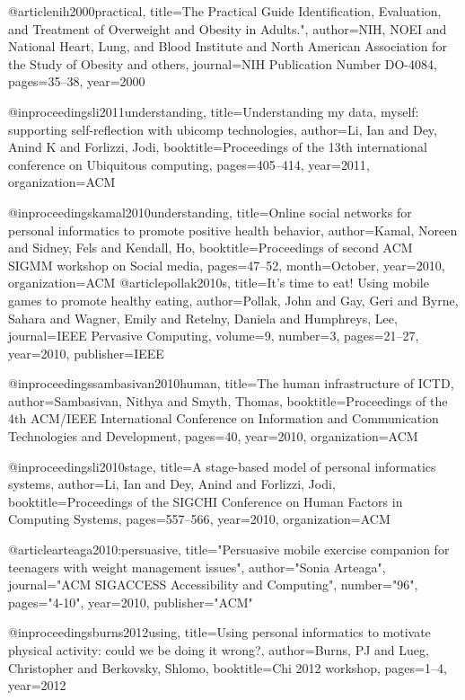 @article{nih2000practical,
  title={The Practical Guide Identification, Evaluation, and Treatment of Overweight and Obesity in Adults."},
  author={NIH, NOEI and National Heart, Lung, and Blood Institute and North American Association for the Study of Obesity and others},
  journal={NIH Publication Number DO-4084},
  pages={35--38},
  year={2000}
}

@inproceedings{li2011understanding,
  title={Understanding my data, myself: supporting self-reflection with ubicomp technologies},
  author={Li, Ian and Dey, Anind K and Forlizzi, Jodi},
  booktitle={Proceedings of the 13th international conference on Ubiquitous computing},
  pages={405--414},
  year={2011},
  organization={ACM}
}

@inproceedings{kamal2010understanding,
  title={Online social networks for personal informatics to promote positive health behavior},
  author={Kamal, Noreen and Sidney, Fels and Kendall, Ho},
  booktitle={Proceedings of second ACM SIGMM workshop on Social media},
  pages={47--52},
  month={October},
  year={2010},
  organization={ACM}
}@article{pollak2010s,
  title={It's time to eat! Using mobile games to promote healthy eating},
  author={Pollak, John and Gay, Geri and Byrne, Sahara and Wagner, Emily and Retelny, Daniela and Humphreys, Lee},
  journal={IEEE Pervasive Computing},
  volume={9},
  number={3},
  pages={21--27},
  year={2010},
  publisher={IEEE}
}


@inproceedings{sambasivan2010human,
  title={The human infrastructure of ICTD},
  author={Sambasivan, Nithya and Smyth, Thomas},
  booktitle={Proceedings of the 4th ACM/IEEE International Conference on Information and Communication Technologies and Development},
  pages={40},
  year={2010},
  organization={ACM}
}

@inproceedings{li2010stage,
  title={A stage-based model of personal informatics systems},
  author={Li, Ian and Dey, Anind and Forlizzi, Jodi},
  booktitle={Proceedings of the SIGCHI Conference on Human Factors in Computing Systems},
  pages={557--566},
  year={2010},
  organization={ACM}
}


@article{arteaga2010:persuasive,
  title="Persuasive mobile exercise companion for teenagers with weight management issues",
  author="Sonia Arteaga",
  journal="ACM SIGACCESS Accessibility and Computing",
  number="96",
  pages="4-10",
  year={2010},
  publisher="ACM"
}

@inproceedings{burns2012using,
  title={Using personal informatics to motivate physical activity: could we be doing it wrong?},
  author={Burns, PJ and Lueg, Christopher and Berkovsky, Shlomo},
  booktitle={Chi 2012 workshop},
  pages={1--4},
  year={2012}
}


